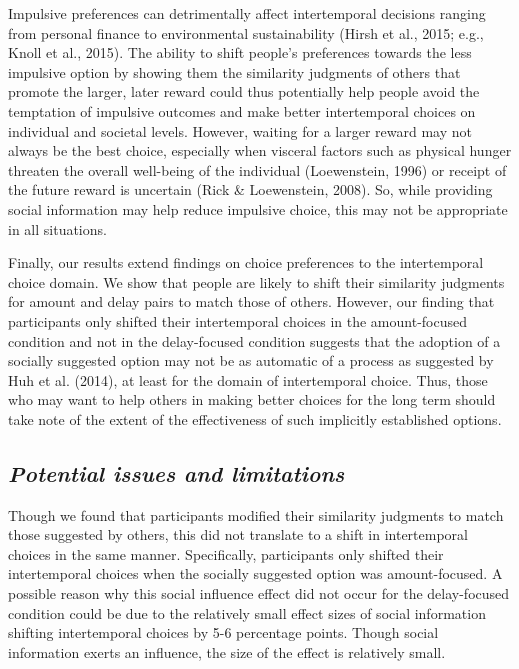 \documentclass[
  pub,floatsintext]{apa6}
\begin{document}
Impulsive preferences can detrimentally affect intertemporal decisions ranging from personal finance to environmental sustainability (Hirsh et al., 2015; e.g., Knoll et al., 2015). The ability to shift people's preferences towards the less impulsive option by showing them the similarity judgments of others that promote the larger, later reward could thus potentially help people avoid the temptation of impulsive outcomes and make better intertemporal choices on individual and societal levels. However, waiting for a larger reward may not always be the best choice, especially when visceral factors such as physical hunger threaten the overall well-being of the individual (Loewenstein, 1996) or receipt of the future reward is uncertain (Rick \& Loewenstein, 2008). So, while providing social information may help reduce impulsive choice, this may not be appropriate in all situations.

Finally, our results extend findings on choice preferences to the intertemporal choice domain. We show that people are likely to shift their similarity judgments for amount and delay pairs to match those of others. However, our finding that participants only shifted their intertemporal choices in the amount-focused condition and not in the delay-focused condition suggests that the adoption of a socially suggested option may not be as automatic of a process as suggested by Huh et al. (2014), at least for the domain of intertemporal choice. Thus, those who may want to help others in making better choices for the long term should take note of the extent of the effectiveness of such implicitly established options.

\hypertarget{potential-issues-and-limitations}{%
\subsection{\texorpdfstring{\emph{Potential issues and limitations}}{Potential issues and limitations}}\label{potential-issues-and-limitations}}

Though we found that participants modified their similarity judgments to match those suggested by others, this did not translate to a shift in intertemporal choices in the same manner. Specifically, participants only shifted their intertemporal choices when the socially suggested option was amount-focused. A possible reason why this social influence effect did not occur for the delay-focused condition could be due to the relatively small effect sizes of social information shifting intertemporal choices by 5-6 percentage points. Though social information exerts an influence, the size of the effect is relatively small.
\end{document}
